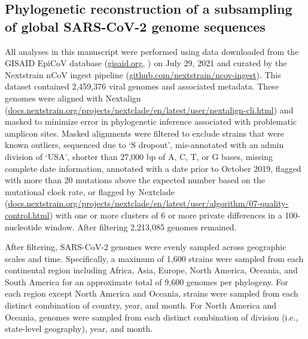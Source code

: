 \documentclass[11pt,oneside,letterpaper]{article}
\begin{document}
\subsection*{Phylogenetic reconstruction of a subsampling of global SARS-CoV-2 genome sequences}
All analyses in this manuscript were performed using data downloaded from the GISAID EpiCoV database (\href{https://gisaid.org}{gisaid.org}, \cite{Shu2017-ql}) on July 29, 2021 and curated by the Nextstrain nCoV ingest pipeline (\href{https://github.com/nextstrain/ncov-ingest}{github.com/nextstrain/ncov-ingest}).
This dataset contained 2,459,376 viral genomes and associated metadata.
These genomes were aligned with Nextalign (\href{https://docs.nextstrain.org/projects/nextclade/en/latest/user/nextalign-cli.html}{docs.nextstrain.org/projects/nextclade/en/latest/user/nextalign-cli.html}) and masked to minimize error in phylogenetic inference associated with problematic amplicon sites.
Masked alignments were filtered to exclude strains that were known outliers, sequenced due to `S dropout', mis-annotated with an admin division of `USA', shorter than 27,000 bp of A, C, T, or G bases, missing complete date information, annotated with a date prior to October 2019, flagged with more than 20 mutations above the expected number based on the mutational clock rate, or flagged by Nextclade (\href{https://docs.nextstrain.org/projects/nextclade/en/latest/user/algorithm/07-quality-control.html}{docs.nextstrain.org/projects/nextclade/en/latest/user/algorithm/07-quality-control.html}) with one or more clusters of 6 or more private differences in a 100-nucleotide window.
After filtering 2,213,085 genomes remained.

After filtering, SARS-CoV-2 genomes were evenly sampled across geographic scales and time. Specifically, a maximum of 1,600 strains were sampled from each continental region including Africa, Asia, Europe, North America, Oceania, and South America for an approximate total of 9,600 genomes per phylogeny.
For each region except North America and Oceania, strains were sampled from each distinct combination of country, year, and month.
For North America and Oceania, genomes were sampled from each distinct combination of division (i.e., state-level geography), year, and month.
\end{document}
